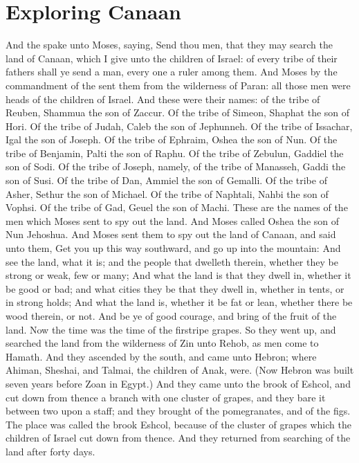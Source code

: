 \section*{Exploring Canaan}
\begin{biblechapter} %
\verse And the \LORD spake unto Moses, saying,
\verse Send thou men, that they may search the land of Canaan, which I give unto the children of Israel: of every tribe of their fathers shall ye send a man, every one a ruler among them.
\verse And Moses by the commandment of the \LORD sent them from the wilderness of Paran: all those men were heads of the children of Israel.
\verse And these were their names: of the tribe of Reuben, Shammua the son of Zaccur.
\verse Of the tribe of Simeon, Shaphat the son of Hori.
\verse Of the tribe of Judah, Caleb the son of Jephunneh.
\verse Of the tribe of Issachar, Igal the son of Joseph.
\verse Of the tribe of Ephraim, Oshea the son of Nun.
\verse Of the tribe of Benjamin, Palti the son of Raphu.
\verse Of the tribe of Zebulun, Gaddiel the son of Sodi.
\verse Of the tribe of Joseph, namely, of the tribe of Manasseh, Gaddi the son of Susi.
\verse Of the tribe of Dan, Ammiel the son of Gemalli.
\verse Of the tribe of Asher, Sethur the son of Michael.
\verse Of the tribe of Naphtali, Nahbi the son of Vophsi.
\verse Of the tribe of Gad, Geuel the son of Machi.
\verse These are the names of the men which Moses sent to spy out the land. And Moses called Oshea the son of Nun Jehoshua.
\verse And Moses sent them to spy out the land of Canaan, and said unto them, Get you up this way southward, and go up into the mountain:
\verse And see the land, what it is; and the people that dwelleth therein, whether they be strong or weak, few or many;
\verse And what the land is that they dwell in, whether it be good or bad; and what cities they be that they dwell in, whether in tents, or in strong holds;
\verse And what the land is, whether it be fat or lean, whether there be wood therein, or not. And be ye of good courage, and bring of the fruit of the land. Now the time was the time of the firstripe grapes.
\verse So they went up, and searched the land from the wilderness of Zin unto Rehob, as men come to Hamath.
\verse And they ascended by the south, and came unto Hebron; where Ahiman, Sheshai, and Talmai, the children of Anak, were. (Now Hebron was built seven years before Zoan in Egypt.)
\verse And they came unto the brook of Eshcol, and cut down from thence a branch with one cluster of grapes, and they bare it between two upon a staff; and they brought of the pomegranates, and of the figs.
\verse The place was called the brook Eshcol, because of the cluster of grapes which the children of Israel cut down from thence.
\verse And they returned from searching of the land after forty days.

\end{biblechapter}
